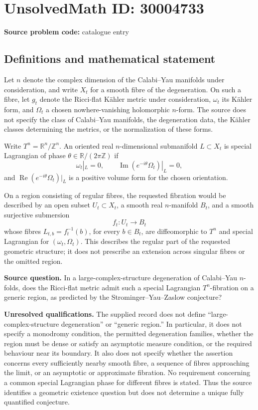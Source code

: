 \documentclass[11pt]{article}
\newcommand{\Z}{\mathbb{Z}}
\newcommand{\R}{\mathbb{R}}
\begin{document}
\section*{UnsolvedMath ID: 30004733}
\textbf{Source problem code:} catalogue entry
\subsection{Definitions and mathematical statement}
Let \(n\) denote the complex dimension of the Calabi--Yau manifolds under consideration, and write \(X_t\) for a smooth fibre of the degeneration. On such a fibre, let \(g_t\) denote the Ricci-flat Kähler metric under consideration, \(\omega_t\) its Kähler form, and \(\Omega_t\) a chosen nowhere-vanishing holomorphic \(n\)-form. The source does not specify the class of Calabi--Yau manifolds, the degeneration data, the Kähler classes determining the metrics, or the normalization of these forms.

Write \(T^n=\R^n/\Z^n\). An oriented real \(n\)-dimensional submanifold \(L\subset X_t\) is special Lagrangian of phase \(\theta\in\R/(2\pi\Z)\) if
\[
\omega_t|_L=0,\qquad
\operatorname{Im}(e^{-i\theta}\Omega_t)|_L=0,
\]
and \(\operatorname{Re}(e^{-i\theta}\Omega_t)|_L\) is a positive volume form for the chosen orientation.

On a region consisting of regular fibres, the requested fibration would be described by an open subset \(U_t\subset X_t\), a smooth real \(n\)-manifold \(B_t\), and a smooth surjective submersion
\[
f_t:U_t\longrightarrow B_t
\]
whose fibres \(L_{t,b}=f_t^{-1}(b)\), for every \(b\in B_t\), are diffeomorphic to \(T^n\) and special Lagrangian for \((\omega_t,\Omega_t)\). This describes the regular part of the requested geometric structure; it does not prescribe an extension across singular fibres or the omitted region.

\textbf{Source question.} In a large-complex-structure degeneration of Calabi--Yau \(n\)-folds, does the Ricci-flat metric admit such a special Lagrangian \(T^n\)-fibration on a generic region, as predicted by the Strominger--Yau--Zaslow conjecture?

\textbf{Unresolved qualifications.} The supplied record does not define ``large-complex-structure degeneration'' or ``generic region.'' In particular, it does not specify a monodromy condition, the permitted degeneration families, whether the region must be dense or satisfy an asymptotic measure condition, or the required behaviour near its boundary. It also does not specify whether the assertion concerns every sufficiently nearby smooth fibre, a sequence of fibres approaching the limit, or an asymptotic or approximate fibration. No requirement concerning a common special Lagrangian phase for different fibres is stated. Thus the source identifies a geometric existence question but does not determine a unique fully quantified conjecture.
\end{document}
